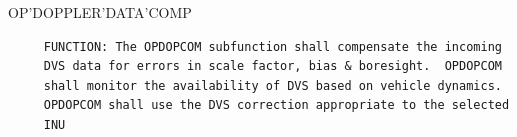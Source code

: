 \begin{frame}
OP'DOPPLER'DATA'COMP
\begin{verbatim}
     FUNCTION: The OPDOPCOM subfunction shall compensate the incoming
     DVS data for errors in scale factor, bias & boresight.  OPDOPCOM
     shall monitor the availability of DVS based on vehicle dynamics.
     OPDOPCOM shall use the DVS correction appropriate to the selected
     INU
     
\end{verbatim}
\end{frame}
